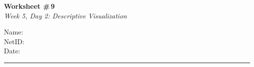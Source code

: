 \documentclass[11pt]{article}
\begin{document}
\noindent
\begin{minipage}[t]{0.55\textwidth}
  \vspace{0pt}
  {\LARGE \textbf{Worksheet \#\,9}} \\[0.3em]
  {\large \textit{Week 5, Day 2: Descriptive Visualization}}
\end{minipage}
\hfill
\begin{minipage}[t]{0.40\textwidth}
  \vspace{0pt}
  \begin{mdframed}[linecolor=black, linewidth=1pt, innertopmargin=10pt, innerbottommargin=10pt]
    \small
    \vspace{0.4cm}
    Name: \underline{\hspace{4.5cm}} \\[1em]
    NetID: \underline{\hspace{4.3cm}} \\[1em]
    Date: \underline{\hspace{4.4cm}} \\
  \end{mdframed}
\end{minipage}

\vspace{1em}
\noindent\rule{\linewidth}{1pt}
\vspace{0.2em}
\end{document}
